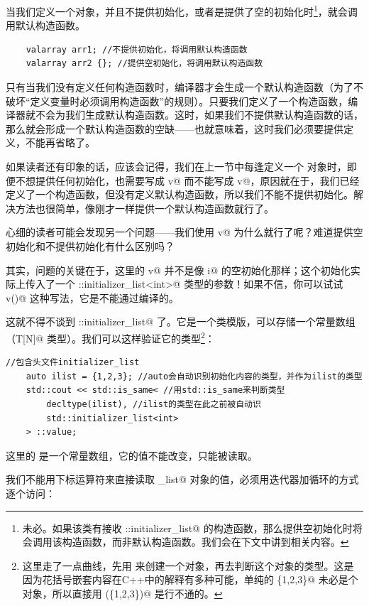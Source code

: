 当我们定义一个对象，并且不提供初始化，或者是提供了空的初始化时\footnote{未必。如果该类有接收 \lstinline@std::initializer_list@ 的构造函数，那么提供空初始化时将会调用该构造函数，而非默认构造函数。我们会在下文中讲到相关内容。}，就会调用默认构造函数。
\begin{lstlisting}
    valarray arr1; //不提供初始化，将调用默认构造函数
    valarray arr2 {}; //提供空初始化，将调用默认构造函数
\end{lstlisting}\par
只有当我们没有定义任何构造函数时，编译器才会生成一个默认构造函数（为了不破坏``定义变量时必须调用构造函数''的规则）。只要我们定义了一个构造函数，编译器就不会为我们生成默认构造函数。这时，如果我们不提供默认构造函数的话，那么就会形成一个默认构造函数的空缺——也就意味着，这时我们必须要提供定义，不能再省略了。\par
如果读者还有印象的话，应该会记得，我们在上一节中每逢定义一个 \lstinline@valarri@ 对象时，即便不想提供任何初始化，也需要写成 \lstinline@valarri v{}@ 而不能写成 \lstinline@valarri v@，原因就在于，我们已经定义了一个构造函数，但没有定义默认构造函数，所以我们不能不提供初始化。解决方法也很简单，像刚才一样提供一个默认构造函数就行了。\par
心细的读者可能会发现另一个问题——我们使用 \lstinline@valarri v{}@ 为什么就行了呢？难道提供空初始化和不提供初始化有什么区别吗？\par
其实，问题的关键在于，这里的 \lstinline@valarri v{}@ 并不是像 \lstinline@int i{}@ 的空初始化那样；这个初始化实际上传入了一个 \lstinline@std::initializer_list<int>@ 类型的参数！如果不信，你可以试试 \lstinline@valarri v()@ 这种写法，它是不能通过编译的。\par
这就不得不谈到 \lstinline@std::initializer_list@ 了。它是一个类模版，可以存储一个常量数组（\lstinline@const T[N]@ 类型）。我们可以这样验证它的类型\footnote{这里走了一点曲线，先用 \lstinline@auto@ 来创建一个对象，再去判断这个对象的类型。这是因为花括号嵌套内容在C++中的解释有多种可能，单纯的 \lstinline@\{1,2,3\}@ 未必是个对象，所以直接用 \lstinline@decltype(\{1,2,3\})@ 是行不通的。}：
\begin{lstlisting}
//包含头文件initializer_list
    auto ilist = {1,2,3}; //auto会自动识别初始化内容的类型，并作为ilist的类型
    std::cout << std::is_same< //用std::is_same来判断类型
        decltype(ilist), //ilist的类型在此之前被自动识
        std::initializer_list<int>
    > ::value;
\end{lstlisting}
这里的 \lstinline@ilist@ 是一个常量数组，它的值不能改变，只能被读取。\par
我们不能用下标运算符来直接读取 \lstinline@initializer_list@ 对象的值，必须用迭代器加循环的方式逐个访问：
